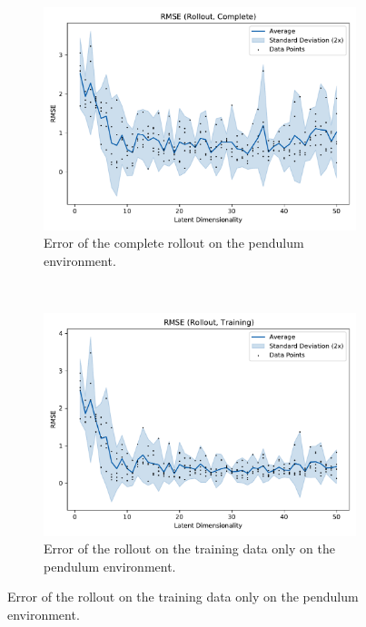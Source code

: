 			\begin{figure}
				\centering
				\begin{subfigure}{0.7\linewidth}
					\centering
					\includegraphics[width=\linewidth]{figures/results/pendulum/latent-dim/comparison-rmse-rollout-mean-vs-latent-dim.pdf}
					\caption{Error of the complete rollout on the pendulum environment.}
					\label{fig:pendulumRmseComplete}
				\end{subfigure} \\
				\begin{subfigure}{0.5\linewidth}
					\centering
					\includegraphics[width=\linewidth]{figures/results/pendulum/latent-dim/comparison-rmse-rollout-train-mean-vs-latent-dim.pdf}
					\caption{Error of the rollout on the training data only on the pendulum environment.}
					\label{fig:pendulumRmseTrain}

\end{subfigure}
\end{figure}
